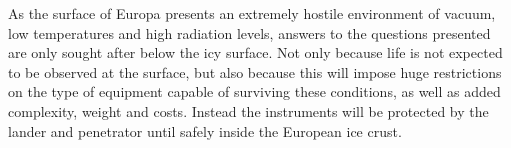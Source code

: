 As the surface of Europa presents an extremely hostile environment of vacuum, low temperatures and high radiation levels, answers to the questions presented are only sought after below the icy surface. Not only because life is not expected to be observed at the surface, but also because this will impose huge restrictions on the type of equipment capable of surviving these conditions, as well as added complexity, weight and costs. Instead the instruments will be protected by the lander and penetrator until safely inside the European ice crust.
